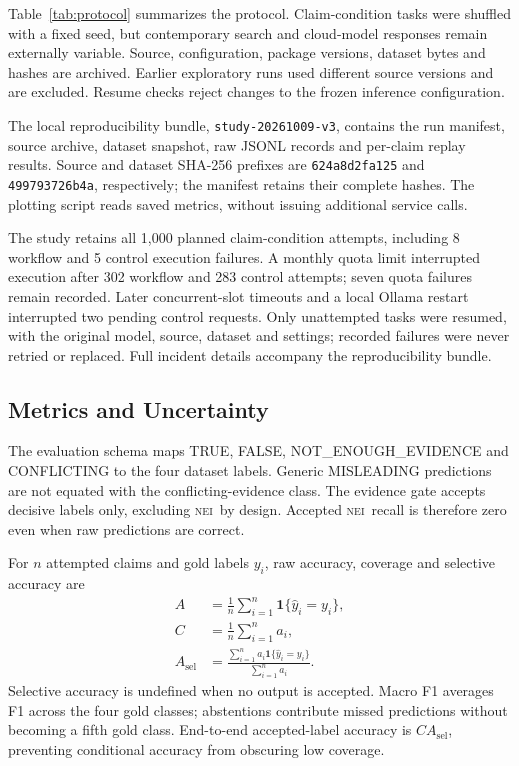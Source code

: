 \documentclass[conference]{IEEEtran}
\newcommand{\NEI}{\textsc{nei}}
\begin{document}
Table~\ref{tab:protocol} summarizes the protocol. Claim-condition tasks were shuffled with a fixed seed, but contemporary search and cloud-model responses remain externally variable. Source, configuration, package versions, dataset bytes and hashes are archived. Earlier exploratory runs used different source versions and are excluded. Resume checks reject changes to the frozen inference configuration.

The local reproducibility bundle, \texttt{study-20261009-v3}, contains the run manifest, source archive, dataset snapshot, raw JSONL records and per-claim replay results. Source and dataset SHA-256 prefixes are \texttt{624a8d2fa125} and \texttt{499793726b4a}, respectively; the manifest retains their complete hashes. The plotting script reads saved metrics, without issuing additional service calls.

The study retains all 1,000 planned claim-condition attempts, including 8 workflow and 5 control execution failures. A monthly quota limit interrupted execution after 302 workflow and 283 control attempts; seven quota failures remain recorded. Later concurrent-slot timeouts and a local Ollama restart interrupted two pending control requests. Only unattempted tasks were resumed, with the original model, source, dataset and settings; recorded failures were never retried or replaced. Full incident details accompany the reproducibility bundle.

\subsection{Metrics and Uncertainty}
The evaluation schema maps TRUE, FALSE, NOT\_ENOUGH\_EVIDENCE and CONFLICTING to the four dataset labels. Generic MISLEADING predictions are not equated with the conflicting-evidence class. The evidence gate accepts decisive labels only, excluding \NEI\ by design. Accepted \NEI\ recall is therefore zero even when raw predictions are correct.

For $n$ attempted claims and gold labels $y_i$, raw accuracy, coverage and selective accuracy are
\begin{align}
A &= \frac{1}{n}\sum_{i=1}^{n}\mathbf{1}\{\hat y_i=y_i\},\\
C &= \frac{1}{n}\sum_{i=1}^{n}a_i,\\
A_{\mathrm{sel}} &=
\frac{\sum_{i=1}^{n}a_i\mathbf{1}\{\hat y_i=y_i\}}
{\sum_{i=1}^{n}a_i}.
\end{align}
Selective accuracy is undefined when no output is accepted. Macro F1 averages F1 across the four gold classes; abstentions contribute missed predictions without becoming a fifth gold class. End-to-end accepted-label accuracy is $C A_{\mathrm{sel}}$, preventing conditional accuracy from obscuring low coverage.
\end{document}
